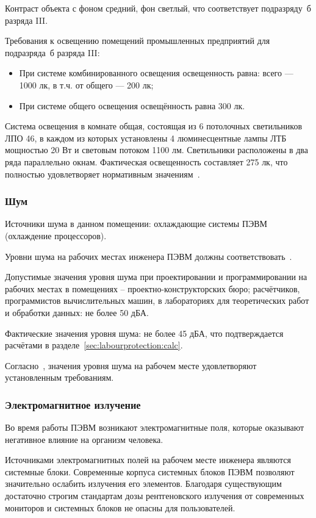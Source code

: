 Контраст объекта с фоном средний, фон светлый, что соответствует подразряду~б разряда III.

Требования к освещению помещений промышленных предприятий для подразряда~б разряда III:
\begin{itemize}
	\item При системе комбинированного освещения освещенность равна: всего --- 1000 лк, в т.ч. от общего --- 200 лк;
	\item При системе общего освещения освещённость равна 300 лк.
\end{itemize}

Система освещения в комнате общая, состоящая из 6 потолочных светильников ЛПО 46, в каждом из которых установлены 4 люминесцентные лампы ЛТБ мощностью 20 Вт и световым потоком 1100 лм. Светильники расположены в два ряда параллельно окнам. Фактическая освещенность составляет 275 лк, что полностью удовлетворяет нормативным значениям~\cite{SNiP23_05_95}.

\subsubsection{Шум}
Источники шума в данном помещении: охлаждающие системы ПЭВМ (охлаждение процессоров).

Уровни шума на рабочих местах инженера ПЭВМ должны соответствовать~\cite{GOST12_1_003}.

Допустимые значения уровня шума при проектировании и программировании на рабочих местах в помещениях – проектно-конструкторских бюро; расчётчиков, программистов вычислительных машин, в лабораториях для теоретических работ и обработки данных: не более  50 дБА.

Фактические значения уровня шума: не более 45 дБА, что подтверждается расчётами в разделе~\ref{sec:labourprotection:calc}.

Согласно~\cite{GOST12_1_003}, значения уровня шума на рабочем месте удовлетворяют установленным требованиям.

\subsubsection{Электромагнитное излучение}
Во время работы ПЭВМ возникают электромагнитные поля, которые оказывают негативное влияние на организм человека.

Источниками электромагнитных полей на рабочем месте инженера являются системные блоки. Современные корпуса системных блоков ПЭВМ позволяют значительно ослабить излучения его элементов. Благодаря существующим достаточно строгим стандартам дозы рентгеновского излучения от современных мониторов и системных блоков не опасны для пользователей.


